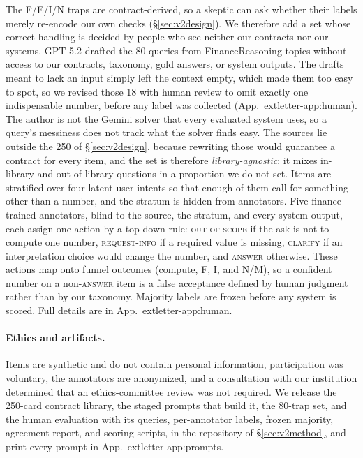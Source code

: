 \documentclass[sigconf]{acmart}
\newif\ifarxiv
\newcommand{\extref}[1]{App.~\ifarxiv\ref{#1}\else\csname extletter-#1\endcsname\fi}
\begin{document}
The F/E/I/N traps are contract-derived, so a skeptic can ask whether their labels merely re-encode our own checks (\S\ref{sec:v2design}). We therefore add a set whose correct handling is decided by people who see neither our contracts nor our systems.
GPT-5.2 drafted the 80 queries from FinanceReasoning topics without access to our contracts, taxonomy, gold answers, or system outputs. The drafts meant to lack an input simply left the context empty, which made them too easy to spot, so we revised those 18 with human review to omit exactly one indispensable number, before any label was collected (\extref{app:human}). The author is not the Gemini solver that every evaluated system uses, so a query's messiness does not track what the solver finds easy. The sources lie outside the 250 of \S\ref{sec:v2design}, because rewriting those would guarantee a contract for every item, and the set is therefore \emph{library-agnostic}: it mixes in-library and out-of-library questions in a proportion we do not set. Items are stratified over four latent user intents so that enough of them call for something other than a number, and the stratum is hidden from annotators.
Five finance-trained annotators, blind to the source, the stratum, and every system output, each assign one action by a top-down rule: \textsc{out-of-scope} if the ask is not to compute one number, \textsc{request-info} if a required value is missing, \textsc{clarify} if an interpretation choice would change the number, and \textsc{answer} otherwise. These actions map onto funnel outcomes (compute, F, I, and N/M), so a confident number on a non-\textsc{answer} item is a false acceptance defined by human judgment rather than by our taxonomy. Majority labels are frozen before any system is scored. Full details are in \extref{app:human}.

\paragraph{Ethics and artifacts.}
Items are synthetic and do not contain personal information, participation was voluntary, the annotators are anonymized, and a consultation with our institution determined that an ethics-committee review was not required. We release the 250-card contract library, the staged prompts that build it, the 80-trap set, and the human evaluation with its queries, per-annotator labels, frozen majority, agreement report, and scoring scripts, in the repository of \S\ref{sec:v2method}, and print every prompt in \extref{app:prompts}.
\end{document}
